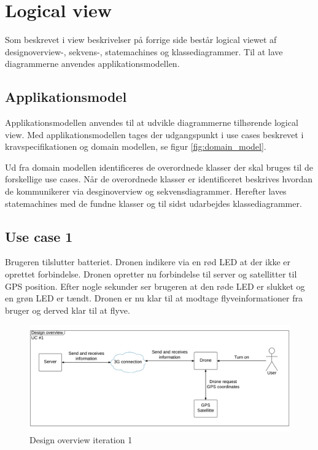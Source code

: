 \section{Logical view}

Som beskrevet i view beskrivelser på forrige side består logical viewet af designoverview-, sekvens-, statemachines og klassediagrammer. Til at lave diagrammerne anvendes applikationsmodellen.

\subsection{Applikationsmodel}
Applikationsmodellen anvendes til at udvikle diagrammerne tilhørende logical view. Med applikationsmodellen tages der udgangspunkt i use cases beskrevet i kravspecifikationen og domain modellen, se figur \ref{fig:domain_model}.
  
Ud fra domain modellen identificeres de overordnede klasser der skal bruges til de forskellige use cases. Når de overordnede klasser er identificeret beskrives hvordan de kommunikerer via desginoverview og sekvensdiagrammer. Herefter laves statemachines med de fundne klasser og til sidst udarbejdes klassediagrammer.


\subsection{Use case 1}

Brugeren tilslutter batteriet. Dronen indikere via en rød LED at der ikke er oprettet forbindelse. Dronen opretter nu forbindelse til server og satellitter til GPS position. Efter nogle sekunder ser brugeren at den røde LED er slukket og en grøn LED er tændt. Dronen er nu klar til at modtage flyveinformationer fra bruger og derved klar til at flyve.

\vspace{-5pt}
\begin{figure}[H]
	\centering
	\includegraphics[width=1\textwidth]{Billeder/design_overview/design_overview_UC1.png}
	\vspace{-1cm}
	\caption{Design overview iteration 1}
	\label{fig:design_overview_it1}
\end{figure}




